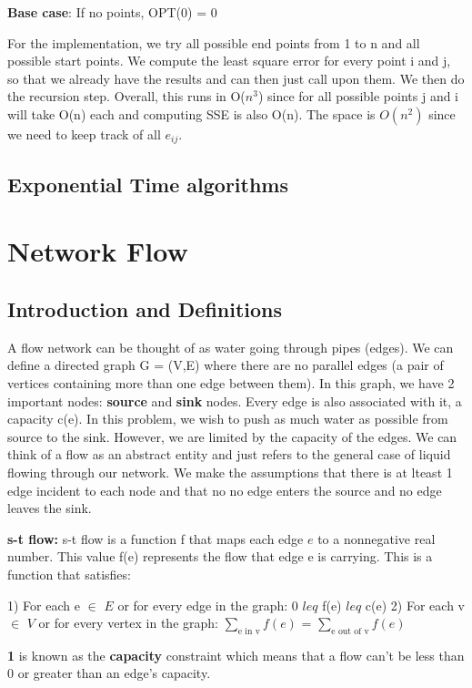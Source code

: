 \documentclass[11pt, oneside]{article}
\theoremstyle{definition}
\begin{document}
\textbf{Base case}: If no points, OPT(0) = 0

For the implementation, we try all possible end points from 1 to n and all possible start points. We compute the least square error for every point i and j, so that we already have the results and can then just call upon them. We then do the recursion step. Overall, this runs in O($n^3$) since for all possible points j and i will take O(n) each and computing SSE is also O(n). The space is $O(n^2)$ since we need to keep track of all $e_{ij}$.

\subsection{Exponential Time algorithms}

\newpage
\section{Network Flow}
\subsection{Introduction and Definitions}
A flow network can be thought of as water going through pipes (edges).
We can define a directed graph G = (V,E) where there are no parallel edges (a pair of vertices containing more than one edge between them). In this graph, we have 2 important nodes: \textbf{source} and \textbf{sink} nodes. Every edge is also associated with it, a capacity c(e). In this problem, we wish to push as much water as possible from source to the sink. However, we are limited by the capacity of the edges. We can think of a flow as an abstract entity and just refers to the general case of liquid flowing through our network. We make the assumptions that there is at lteast 1 edge incident to each node and that no no edge enters the source and no edge leaves the sink.

\textbf{s-t flow:} s-t flow is a function f that maps each edge $e$ to a nonnegative real number. This value f(e) represents the flow that edge e is carrying. This is a function that satisfies:

1) For each e $\in$ $E$ or for every edge in the graph: 0 $leq$ f(e) $leq$ c(e)
2) For each v $\in$ $V$ or for every vertex in the graph: $\sum_{\text{e in v}}f(e)$ = $\sum_{\text{e out of v}}f(e)$

\textbf{1} is known as the \textbf{capacity} constraint which means that a flow can't be less than 0 or greater than an edge's capacity.
\end{document}
